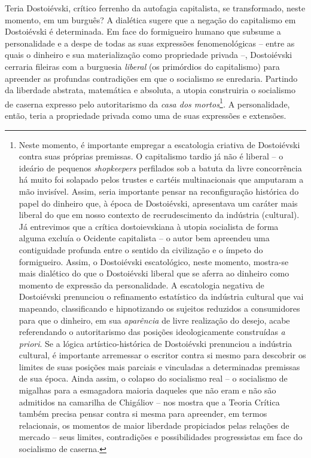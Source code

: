 Teria Dostoiévski, crítico ferrenho da autofagia capitalista, se
transformado, neste momento, em um burguês? A dialética sugere que a
negação do capitalismo em Dostoiévski é determinada. Em face do
formigueiro humano que subsume a personalidade e a despe de todas as
suas expressões fenomenológicas -- entre as quais o dinheiro e sua
materialização como propriedade privada --, Dostoiévski cerraria
fileiras com a burguesia \emph{liberal} (os primórdios do capitalismo)
para apreender as profundas contradições em que o socialismo se
enredaria. Partindo da liberdade abstrata, matemática e absoluta, a
utopia construiria o socialismo de caserna expresso pelo autoritarismo
da \emph{casa dos mortos}\footnote{Neste momento, é importante empregar
  a escatologia criativa de Dostoiévski contra suas próprias premissas.
  O capitalismo tardio já não é liberal -- o ideário de pequenos
  \emph{shopkeepers} perfilados sob a batuta da livre concorrência há
  muito foi solapado pelos trustes e cartéis multinacionais que
  amputaram a mão invisível. Assim, seria importante pensar na
  reconfiguração histórica do papel do dinheiro que, à época de
  Dostoiévski, apresentava um caráter mais liberal do que em nosso
  contexto de recrudescimento da indústria (cultural). Já entrevimos que
  a crítica dostoievskiana à utopia socialista de forma alguma excluía o
  Ocidente capitalista -- o autor bem apreendeu uma contiguidade
  profunda entre o sentido da civilização e o ímpeto do formigueiro.
  Assim, o Dostoiévski escatológico, neste momento, mostra-se mais
  dialético do que o Dostoiévski liberal que se aferra ao dinheiro como
  momento de expressão da personalidade. A escatologia negativa de
  Dostoiévski prenunciou o refinamento estatístico da indústria cultural
  que vai mapeando, classificando e hipnotizando os sujeitos reduzidos a
  consumidores para que o dinheiro, em sua \emph{aparência} de livre
  realização do desejo, acabe referendando o autoritarismo das posições
  ideologicamente construídas \emph{a priori}. Se a lógica
  artístico-histórica de Dostoiévski prenunciou a indústria cultural, é
  importante arremessar o escritor contra si mesmo para descobrir os
  limites de suas posições mais parciais e vinculadas a determinadas
  premissas de sua época. Ainda assim, o colapso do socialismo real -- o
  socialismo de migalhas para a esmagadora maioria daqueles que não eram
  e não são admitidos na camarilha de Chigáliov -- nos mostra que a
  Teoria Crítica também precisa pensar contra si mesma para apreender,
  em termos relacionais, os momentos de maior liberdade propiciados
  pelas relações de mercado -- seus limites, contradições e
  possibilidades progressistas em face do socialismo de caserna.}\emph{.}
A personalidade, então, teria a propriedade privada como uma de suas
expressões e extensões.

